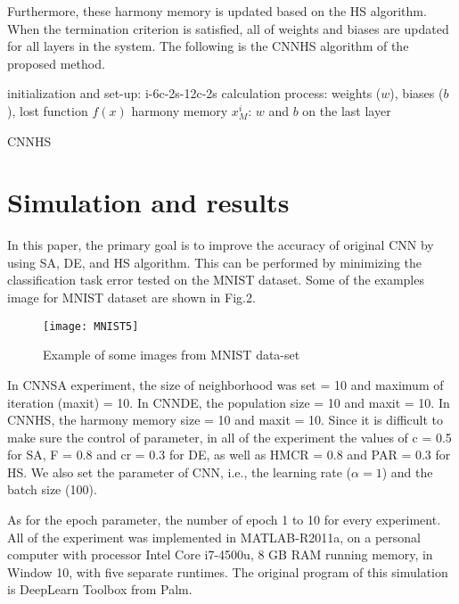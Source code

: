 \documentclass[10pt,letterpaper]{article}
\begin{document}
Furthermore, these harmony memory is updated based on the HS algorithm. When the termination criterion is satisfied, all of weights and biases are updated for all layers in the system. The following is the CNNHS algorithm of the proposed method.

\vspace{3mm}

\begin{algorithm}[H]
\SetAlgoLined
{}
 initialization and set-up: i-6c-2s-12c-2s \;
 calculation process: weights ($w$), biases ($b$), lost function \(f(x)\)\; 
 harmony memory \(x_M^i \):  $w$ and $b$ on the last layer\; 
\caption{CNNHS}
\end{algorithm}


\section{Simulation and results}
In this paper, the primary goal is to improve the accuracy of original CNN by using SA, DE, and HS algorithm. This can be performed by minimizing the classification task error tested on the MNIST dataset. Some of the examples image for MNIST dataset are shown in Fig.2.

\begin{figure}
\texttt{[image: MNIST5]}
\caption{Example of some images from MNIST data-set}
\label{fig:my_label}
\end{figure}

In CNNSA experiment, the size of neighborhood was set = 10 and maximum of iteration (maxit) = 10. In CNNDE, the population size = 10 and  maxit = 10. In CNNHS, the harmony memory size = 10 and maxit = 10. Since it is difficult to make sure the control of parameter, in all of the experiment the values of c = 0.5 for SA, F = 0.8 and cr = 0.3 for DE, as well as HMCR = 0.8 and PAR = 0.3 for HS. We also set the parameter of CNN, i.e., the learning rate ($\alpha = 1$) and the batch size (100). 

As for the epoch parameter, the number of epoch 1 to 10 for every experiment. All of the experiment was implemented in MATLAB-R2011a, on a personal computer with processor Intel Core i7-4500u, 8 GB RAM running memory, in Window 10, with five separate runtimes. The original program of this simulation is DeepLearn Toolbox from Palm\cite{IMM2012-06284}.
\end{document}
